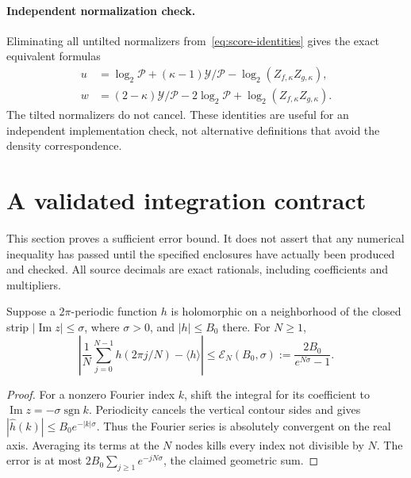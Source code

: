 \paragraph{Independent normalization check.}
Eliminating all untilted normalizers from~\eqref{eq:score-identities}
gives the exact equivalent formulas
\begin{align}
 u&=\log_2\mathcal P+(\kappa-1)\mathcal Y/\mathcal P
       -\log_2(Z_{f,\kappa}Z_{g,\kappa}),\label{eq:cancel-u}\\
 w&=(2-\kappa)\mathcal Y/\mathcal P-2\log_2\mathcal P
       +\log_2(Z_{f,\kappa}Z_{g,\kappa}).\label{eq:cancel-w}
\end{align}
The tilted normalizers do not cancel. These identities are useful for
an independent implementation check, not alternative definitions that
avoid the density correspondence.

\section{A validated integration contract}\label{sec:quadrature}
This section proves a sufficient error bound. It does not assert that
any numerical inequality has passed until the specified enclosures
have actually been produced and checked. All source decimals are
exact rationals, including coefficients and multipliers.

\begin{lemma}\label{lem:trap}
Suppose a $2\pi$-periodic function $h$ is holomorphic on a neighborhood
of the closed strip $|\operatorname{Im}z|\le\sigma$, where $\sigma>0$,
and $|h|\le B_0$ there. For $N\ge1$,
\[
 \left|\frac1N\sum_{j=0}^{N-1}h(2\pi j/N)-\langle h\rangle\right|
 \le \mathcal E_N(B_0,\sigma):=\frac{2B_0}{e^{N\sigma}-1}.
\]
\end{lemma}
\begin{proof}
For a nonzero Fourier index $k$, shift the integral for its coefficient
to $\operatorname{Im}z=-\sigma\operatorname{sgn}k$. Periodicity cancels
the vertical contour sides and gives
$|\widehat h(k)|\le B_0e^{-|k|\sigma}$. Thus the Fourier series is
absolutely convergent on the real axis. Averaging its terms at the
$N$ nodes kills every index not divisible by $N$. The error is at most
$2B_0\sum_{j\ge1}e^{-jN\sigma}$, the claimed geometric sum.
\end{proof}

